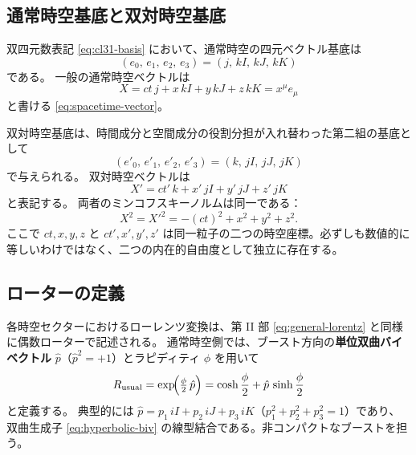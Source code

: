 \documentclass[dvipdfmx,a4paper,oneside]{jsbook}
\numberwithin{equation}{chapter}
\begin{document}
\subsection{通常時空基底と双対時空基底}

双四元数表記 \eqref{eq:cl31-basis} において、通常時空の四元ベクトル基底は
\begin{equation}
  (e_0,\, e_1,\, e_2,\, e_3)
  = (j,\, kI,\, kJ,\, kK)
  \label{eq:usual-basis-dst}
\end{equation}
である。
一般の通常時空ベクトルは
\begin{equation}
  X = ct\, j + x\, kI + y\, kJ + z\, kK = x^\mu e_\mu
  \label{eq:usual-vector-dst}
\end{equation}
と書ける \eqref{eq:spacetime-vector}。

双対時空基底は、時間成分と空間成分の役割分担が入れ替わった第二組の基底として
\begin{equation}
  (e'_0,\, e'_1,\, e'_2,\, e'_3)
  = (k,\, jI,\, jJ,\, jK)
  \label{eq:dual-basis-dst}
\end{equation}
で与えられる。
双対時空ベクトルは
\begin{equation}
  X' = ct'\, k + x'\, jI + y'\, jJ + z'\, jK
  \label{eq:dual-vector-dst}
\end{equation}
と表記する。
両者のミンコフスキーノルムは同一である：
\begin{equation}
  X^2 = X'^2 = -(ct)^2 + x^2 + y^2 + z^2.
  \label{eq:dual-norm-preservation}
\end{equation}
ここで \(ct, x, y, z\) と \(ct', x', y', z'\) は同一粒子の二つの時空座標。必ずしも数値的に等しいわけではなく、二つの内在的自由度として独立に存在する。

\subsection{ローターの定義}

各時空セクターにおけるローレンツ変換は、第 II 部 \eqref{eq:general-lorentz} と同様に偶数ローターで記述される。
通常時空側では、ブースト方向の\textbf{単位双曲バイベクトル} \(\hat{p}\)（\(\hat{p}^2 = +1\)）とラピディティ \(\phi\) を用いて
\begin{equation}
  R_{\mathrm{usual}}
  = \exp\!\Bigl(\tfrac{\phi}{2}\,\hat{p}\Bigr)
  = \cosh\frac{\phi}{2} + \hat{p}\,\sinh\frac{\phi}{2}
  \label{eq:R-usual}
\end{equation}
と定義する。
典型的には \(\hat{p} = p_1\, iI + p_2\, iJ + p_3\, iK\)（\(p_1^2+p_2^2+p_3^2=1\)）であり、双曲生成子 \eqref{eq:hyperbolic-biv} の線型結合である。非コンパクトなブーストを担う。
\end{document}
